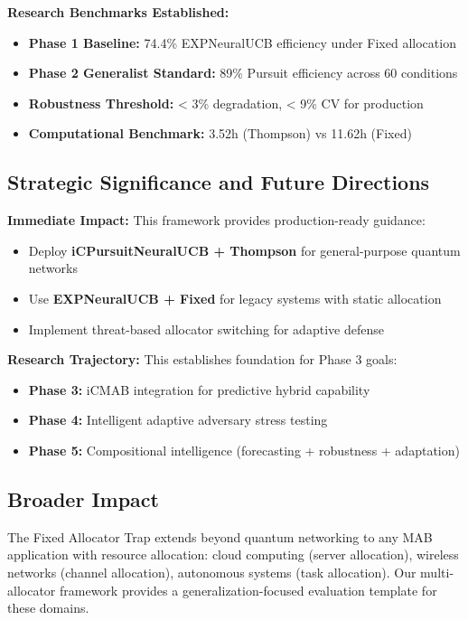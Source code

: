 \documentclass[11pt,a4paper]{article}
\newcommand{\performance}[1]{\textcolor{performancecolor}{\textbf{#1}}}
\newcommand{\success}[1]{\textcolor{successcolor}{\textbf{#1}}}
\begin{document}
\textbf{Research Benchmarks Established:}
\begin{itemize}
    \item \textbf{Phase 1 Baseline:} 74.4\% EXPNeuralUCB efficiency under Fixed allocation
    \item \textbf{Phase 2 Generalist Standard:} 89\% Pursuit efficiency across 60 conditions
    \item \textbf{Robustness Threshold:} < 3\% degradation, < 9\% CV for production
    \item \textbf{Computational Benchmark:} 3.52h (Thompson) vs 11.62h (Fixed)
\end{itemize}

\subsection{Strategic Significance and Future Directions}

\textbf{Immediate Impact:} This framework provides production-ready guidance:
\begin{itemize}
    \item Deploy \success{iCPursuitNeuralUCB + Thompson} for general-purpose quantum networks
    \item Use \performance{EXPNeuralUCB + Fixed} for legacy systems with static allocation
    \item Implement threat-based allocator switching for adaptive defense
\end{itemize}

\textbf{Research Trajectory:} This establishes foundation for Phase 3 goals:
\begin{itemize}
    \item \textbf{Phase 3:} iCMAB integration for predictive hybrid capability
    \item \textbf{Phase 4:} Intelligent adaptive adversary stress testing
    \item \textbf{Phase 5:} Compositional intelligence (forecasting + robustness + adaptation)
\end{itemize}

\subsection{Broader Impact}

The Fixed Allocator Trap extends beyond quantum networking to any MAB application with resource allocation: cloud computing (server allocation), wireless networks (channel allocation), autonomous systems (task allocation). Our multi-allocator framework provides a generalization-focused evaluation template for these domains.
\end{document}
